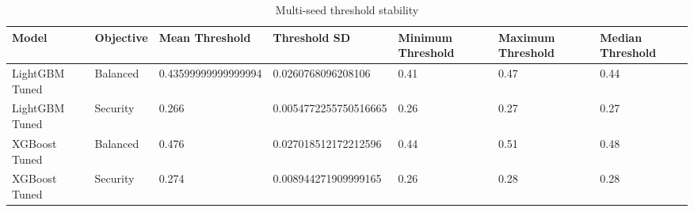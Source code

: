 \begin{table}[htbp]
\centering
\caption{Multi-seed threshold stability}
\begin{tabular}{lllllll}
\hline
Model & Objective & Mean Threshold & Threshold SD & Minimum Threshold & Maximum Threshold & Median Threshold \\
\hline
LightGBM Tuned & Balanced & 0.43599999999999994 & 0.0260768096208106 & 0.41 & 0.47 & 0.44 \\
LightGBM Tuned & Security & 0.266 & 0.0054772255750516665 & 0.26 & 0.27 & 0.27 \\
XGBoost Tuned & Balanced & 0.476 & 0.027018512172212596 & 0.44 & 0.51 & 0.48 \\
XGBoost Tuned & Security & 0.274 & 0.008944271909999165 & 0.26 & 0.28 & 0.28 \\
\hline
\end{tabular}
\end{table}
